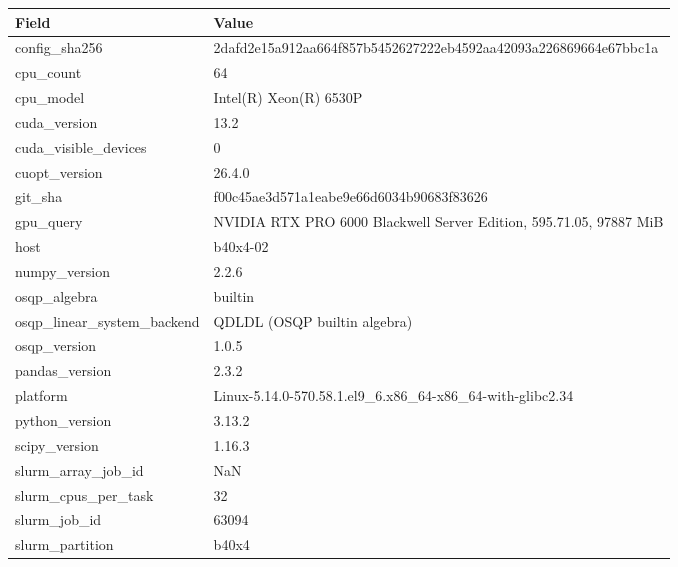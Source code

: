 \begin{table}
\label{tab:environment-hardware}
\begin{tabular}{ll}
\toprule
Field & Value \\
\midrule
config\_sha256 & 2dafd2e15a912aa664f857b5452627222eb4592aa42093a226869664e67bbc1a \\
cpu\_count & 64 \\
cpu\_model & Intel(R) Xeon(R) 6530P \\
cuda\_version & 13.2 \\
cuda\_visible\_devices & 0 \\
cuopt\_version & 26.4.0 \\
git\_sha & f00c45ae3d571a1eabe9e66d6034b90683f83626 \\
gpu\_query & NVIDIA RTX PRO 6000 Blackwell Server Edition, 595.71.05, 97887 MiB \\
host & b40x4-02 \\
numpy\_version & 2.2.6 \\
osqp\_algebra & builtin \\
osqp\_linear\_system\_backend & QDLDL (OSQP builtin algebra) \\
osqp\_version & 1.0.5 \\
pandas\_version & 2.3.2 \\
platform & Linux-5.14.0-570.58.1.el9\_6.x86\_64-x86\_64-with-glibc2.34 \\
python\_version & 3.13.2 \\
scipy\_version & 1.16.3 \\
slurm\_array\_job\_id & NaN \\
slurm\_cpus\_per\_task & 32 \\
slurm\_job\_id & 63094 \\
slurm\_partition & b40x4 \\
\bottomrule
\end{tabular}
\end{table}
